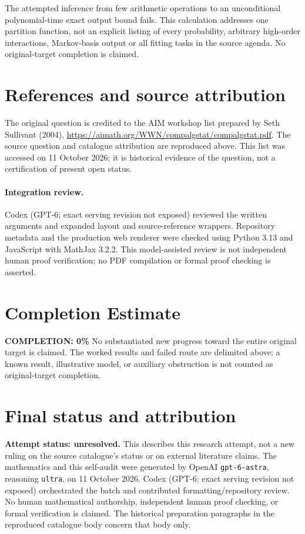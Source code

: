\documentclass[11pt]{article}
\begin{document}
The attempted inference from few arithmetic operations to an unconditional polynomial-time exact output bound fails. This calculation addresses one partition function, not an explicit listing of every probability, arbitrary high-order interactions, Markov-basis output or all fitting tasks in the source agenda. No original-target completion is claimed.

\section{References and source attribution}
The original question is credited to the AIM workshop list prepared by Seth Sullivant (2004), \url{https://aimath.org/WWN/compalgstat/compalgstat.pdf}. The source question and catalogue attribution are reproduced above. This list was accessed on 11 October 2026; it is historical evidence of the question, not a certification of present open status.


\paragraph{Integration review.} Codex (GPT-6; exact serving revision not exposed) reviewed the written arguments and expanded layout and source-reference wrappers. Repository metadata and the production web renderer were checked using Python 3.13 and JavaScript with MathJax 3.2.2. This model-assisted review is not independent human proof verification; no PDF compilation or formal proof checking is asserted.

\section{Completion Estimate}
\noindent\textbf{COMPLETION: 0\%}
No substantiated new progress toward the entire original target is claimed. The worked results and failed route are delimited above; a known result, illustrative model, or auxiliary obstruction is not counted as original-target completion.

\section{Final status and attribution}
\textbf{Attempt status: unresolved.} This describes this research attempt, not a new ruling on the source catalogue's status or on external literature claims.
The mathematics and this self-audit were generated by OpenAI \texttt{gpt-6-astra}, reasoning \texttt{ultra}, on 11 October 2026. Codex (GPT-6; exact serving revision not exposed) orchestrated the batch and contributed formatting/repository review. No human mathematical authorship, independent human proof checking, or formal verification is claimed. The historical preparation paragraphs in the reproduced catalogue body concern that body only.
\end{document}
